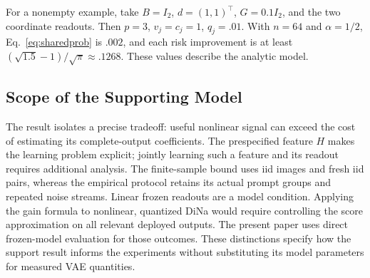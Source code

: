 For a nonempty example, take $B=I_2$, $d=(1,1)^\top$, $G=0.1I_2$, and the two coordinate readouts. Then $p=3$, $v_j=c_j=1$, $q_j=.01$. With $n=64$ and $\alpha=1/2$, Eq.~\eqref{eq:sharedprob} is $.002$, and each risk improvement is at least $(\sqrt{1.5}-1)/\sqrt\pi\approx.1268$. These values describe the analytic model.

\subsection{Scope of the Supporting Model}
The result isolates a precise tradeoff: useful nonlinear signal can exceed the cost of estimating its complete-output coefficients. The prespecified feature $H$ makes the learning problem explicit; jointly learning such a feature and its readout requires additional analysis. The finite-sample bound uses iid images and fresh iid pairs, whereas the empirical protocol retains its actual prompt groups and repeated noise streams. Linear frozen readouts are a model condition. Applying the gain formula to nonlinear, quantized DiNa would require controlling the score approximation on all relevant deployed outputs. The present paper uses direct frozen-model evaluation for those outcomes. These distinctions specify how the support result informs the experiments without substituting its model parameters for measured VAE quantities.

